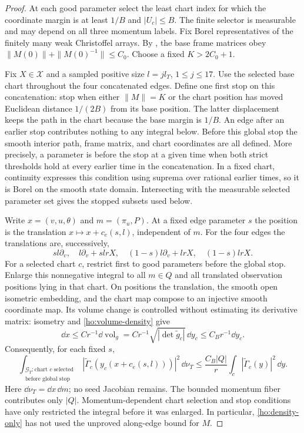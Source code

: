 \begin{proof}
At each good parameter select the least chart index for which the
coordinate margin is at least $1/B$ and $|U_c|\le B$.
The finite selector is measurable and may depend on all three momentum
labels. Fix Borel representatives of the finitely many weak Christoffel
arrays. By , the base frame matrices obey
$\|M(0)\|+\|M(0)^{-1}\|\le C_0$.
Choose a fixed $K>2C_0+1$.

Fix $X\in\mathcal X$ and a sampled positive size
$l=j l_T$, $1\le j\le17$.  Use the selected base chart throughout the
four concatenated edges.  Define one first stop on this concatenation:
stop when either $\|M\|=K$ or the chart position has moved Euclidean
distance $1/(2B)$ from its base position.  The latter displacement
keeps the path in the chart because the base margin is $1/B$.
An edge after an earlier stop contributes nothing to any integral
below. Before this global stop the smooth interior path, frame matrix,
and chart coordinates are all defined. More precisely, a parameter is
before the stop at a given time when both strict thresholds hold at
every earlier time in the concatenation. In a fixed chart, continuity
expresses this condition using suprema over rational earlier times, so
it is Borel on the smooth state domain. Intersecting with the measurable
selected parameter set gives the stopped subsets used below.

Write $x=(v,u,\theta)$ and $m=(\pi_u,P)$.  At a fixed edge parameter
$s$ the position is the translation $x\mapsto x+c_e(s,l)$, independent
of $m$.  For the four edges the translations are, successively,
\[
 sl\partial_v,\quad l\partial_v+slrX,\quad
 (1-s)l\partial_v+lrX,\quad (1-s)lrX.
\]
For a selected chart $c$, restrict first to good parameters before
the global stop.  Enlarge this nonnegative integral to all $m\in Q$
and all translated observation positions lying in that chart.  On
positions the translation, the smooth open isometric embedding, and
the chart map compose to an injective smooth coordinate map.  Its
volume change is controlled without estimating its derivative matrix:
isometry and \eqref{ho:volume-density} give
\begin{equation}\label{ho:density-only}
 \dd x\le C r^{-1}\dd\operatorname{vol}_g
       =C r^{-1}\sqrt{|\det\widetilde g_c|}\,\dd y_c
       \le C_B r^{-1}\dd y_c.
\end{equation}
Consequently, for each fixed $s$,
\begin{equation}\label{ho:fixed-edge-average}
 \int_{\substack{\mathcal G_T:\text{chart }c\text{ selected}\\
                         \text{before global stop}}}
 |\widetilde\Gamma_c(y_c(x+c_e(s,l)))|^2\,\dd\nu_T
 \le \frac{C_B|Q|}{r}
                  \int_{c}|\widetilde\Gamma_c(y)|^2\,\dd y.
\end{equation}
Here $\dd\nu_T=\dd x\,\dd m$; no seed Jacobian remains.
The bounded momentum fiber contributes only $|Q|$.
Momentum-dependent chart selection and stop conditions have only
restricted the integral before it was enlarged.  In particular,
\eqref{ho:density-only} has not used the unproved along-edge bound for
$M$.


\end{proof}
